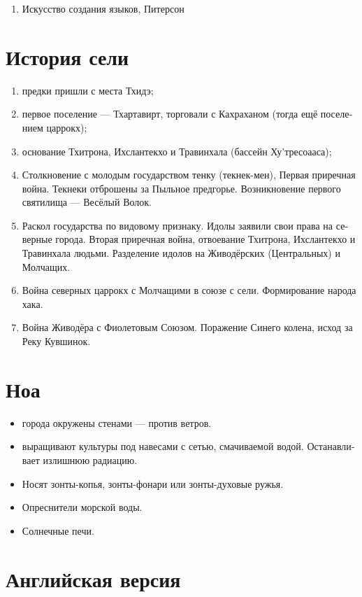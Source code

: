 \documentclass[a4paper,12pt,fleqn]{book}\usepackage{polyglossia}\setdefaultlanguage[babelshorthands=true]{russian}\setotherlanguage{english}\defaultfontfeatures{Ligatures=TeX,Mapping=tex-text}\usepackage{xcolor}\newcommand{\ml}[3]{#2}
\begin{document}
{\begin{enumerate}

\item Искусство создания языков, Питерсон

\end{enumerate}

\section{История сели}

\begin{enumerate}
\item предки пришли с места Тхидэ;
\item первое поселение --- Тхартавирт, торговали с Кахраханом (тогда ещё поселением царрокх);
\item основание Тхитрона, Ихслантекхо и Травинхала (бассейн Ху'тресоааса);
\item Столкновение с молодым государством тенку (текнек-мен), Первая приречная война.
Текнеки отброшены за Пыльное предгорье.
Возникновение первого святилища --- Весёлый Волок.
\item Раскол государства по видовому признаку.
Идолы заявили свои права на северные города.
Вторая приречная война, отвоевание Тхитрона, Ихслантекхо и Травинхала людьми.
Разделение идолов на Живодёрских (Центральных) и Молчащих.
\item Война северных царрокх с Молчащими в союзе с сели.
Формирование народа хака.
\item Война Живодёра с Фиолетовым Союзом.
Поражение Синего колена, исход за Реку Кувшинок.
\end{enumerate}

\section{Ноа}

\begin{itemize}
\item города окружены стенами --- против ветров.
\item выращивают культуры под навесами с сетью, смачиваемой водой.
Останавливает излишнюю радиацию.
\item Носят зонты-копья, зонты-фонари или зонты-духовые ружья.
\item Опреснители морской воды.
\item Солнечные печи.
\end{itemize}

\section{Английская версия}

}
\end{document}
